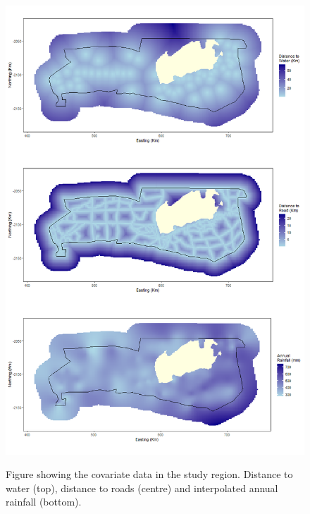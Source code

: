 \begin{figure}[!htb]
\centering
\caption{Figure showing the covariate data in the study region. Distance to water (top), distance to roads (centre) and interpolated annual rainfall (bottom).}
\includegraphics[width=0.9\linewidth]{suppimages/Mike_covardata.png}
\label{fig:covariates}
\end{figure}




